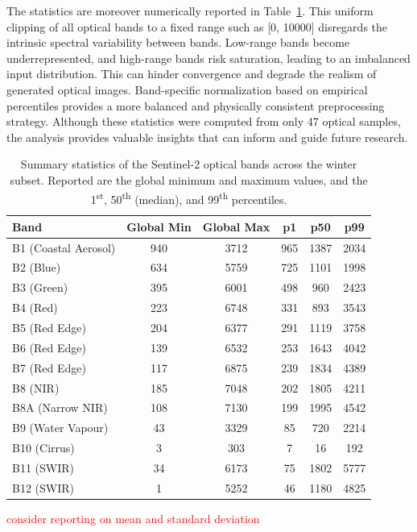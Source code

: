 The statistics are moreover numerically reported in Table~\ref{tab:s2_band_stats}. This uniform clipping of all optical bands to a fixed range such as [0, 10000] disregards the intrinsic spectral variability between bands. Low-range bands become underrepresented, and high-range bands risk saturation, leading to an imbalanced input distribution. This can hinder convergence and degrade the realism of generated optical images. Band-specific normalization based on empirical percentiles provides a more balanced and physically consistent preprocessing strategy. Although these statistics were computed from only 47 optical samples, the analysis provides valuable insights that can inform and guide future research.

\begin{table}[H]
\centering
\caption{Summary statistics of the Sentinel-2 optical bands across the winter subset. Reported are the global minimum and maximum values, and the 1\textsuperscript{st}, 50\textsuperscript{th} (median), and 99\textsuperscript{th} percentiles.}
\label{tab:s2_band_stats}
\begin{tabular}{lccccc}
\toprule
\textbf{Band} & \textbf{Global Min} & \textbf{Global Max} & \textbf{p1} & \textbf{p50} & \textbf{p99} \\
\midrule
B1  (Coastal Aerosol)  & 940  & 3712 & 965  & 1387 & 2034 \\
B2  (Blue)             & 634  & 5759 & 725  & 1101 & 1998 \\
B3  (Green)            & 395  & 6001 & 498  & 960  & 2423 \\
B4  (Red)              & 223  & 6748 & 331  & 893  & 3543 \\
B5  (Red Edge)       & 204  & 6377 & 291  & 1119 & 3758 \\
B6  (Red Edge)       & 139  & 6532 & 253  & 1643 & 4042 \\
B7  (Red Edge)       & 117  & 6875 & 239  & 1834 & 4389 \\
B8  (NIR)              & 185  & 7048 & 202  & 1805 & 4211 \\
B8A (Narrow NIR)       & 108  & 7130 & 199  & 1995 & 4542 \\
B9  (Water Vapour)     & 43   & 3329 & 85   & 720  & 2214 \\
B10 (Cirrus)           & 3    & 303  & 7    & 16   & 192  \\
B11 (SWIR)           & 34   & 6173 & 75   & 1802 & 5777 \\
B12 (SWIR)           & 1    & 5252 & 46   & 1180 & 4825 \\
\bottomrule
\end{tabular}
\end{table}

\textcolor{red}{consider reporting on mean and standard deviation}